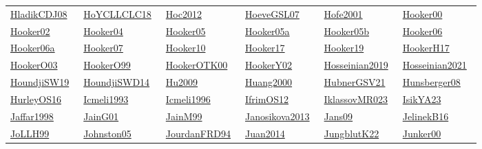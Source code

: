\begin{longtable}{*{6}{l}}
\href{../works/HladikCDJ08.pdf}{HladikCDJ08}~\cite{HladikCDJ08} & \href{../works/HoYCLLCLC18.pdf}{HoYCLLCLC18}~\cite{HoYCLLCLC18} & \href{../}{Hoc2012}~\cite{Hoc2012} & \href{../works/HoeveGSL07.pdf}{HoeveGSL07}~\cite{HoeveGSL07} & \href{../}{Hofe2001}~\cite{Hofe2001} & \href{../}{Hooker00}~\cite{Hooker00}\\ 
\href{../}{Hooker02}~\cite{Hooker02} & \href{../works/Hooker04.pdf}{Hooker04}~\cite{Hooker04} & \href{../works/Hooker05.pdf}{Hooker05}~\cite{Hooker05} & \href{../works/Hooker05a.pdf}{Hooker05a}~\cite{Hooker05a} & \href{../works/Hooker05b.pdf}{Hooker05b}~\cite{Hooker05b} & \href{../works/Hooker06.pdf}{Hooker06}~\cite{Hooker06}\\ 
\href{../}{Hooker06a}~\cite{Hooker06a} & \href{../works/Hooker07.pdf}{Hooker07}~\cite{Hooker07} & \href{../}{Hooker10}~\cite{Hooker10} & \href{../works/Hooker17.pdf}{Hooker17}~\cite{Hooker17} & \href{../works/Hooker19.pdf}{Hooker19}~\cite{Hooker19} & \href{../works/HookerH17.pdf}{HookerH17}~\cite{HookerH17}\\ 
\href{../works/HookerO03.pdf}{HookerO03}~\cite{HookerO03} & \href{../works/HookerO99.pdf}{HookerO99}~\cite{HookerO99} & \href{../works/HookerOTK00.pdf}{HookerOTK00}~\cite{HookerOTK00} & \href{../works/HookerY02.pdf}{HookerY02}~\cite{HookerY02} & \href{../}{Hosseinian2019}~\cite{Hosseinian2019} & \href{../}{Hosseinian2021}~\cite{Hosseinian2021}\\ 
\href{../works/HoundjiSW19.pdf}{HoundjiSW19}~\cite{HoundjiSW19} & \href{../works/HoundjiSWD14.pdf}{HoundjiSWD14}~\cite{HoundjiSWD14} & \href{../}{Hu2009}~\cite{Hu2009} & \href{../}{Huang2000}~\cite{Huang2000} & \href{../works/HubnerGSV21.pdf}{HubnerGSV21}~\cite{HubnerGSV21} & \href{../works/Hunsberger08.pdf}{Hunsberger08}~\cite{Hunsberger08}\\ 
\href{../works/HurleyOS16.pdf}{HurleyOS16}~\cite{HurleyOS16} & \href{../}{Icmeli1993}~\cite{Icmeli1993} & \href{../}{Icmeli1996}~\cite{Icmeli1996} & \href{../works/IfrimOS12.pdf}{IfrimOS12}~\cite{IfrimOS12} & \href{../works/IklassovMR023.pdf}{IklassovMR023}~\cite{IklassovMR023} & \href{../works/IsikYA23.pdf}{IsikYA23}~\cite{IsikYA23}\\ 
\href{../}{Jaffar1998}~\cite{Jaffar1998} & \href{../works/JainG01.pdf}{JainG01}~\cite{JainG01} & \href{../works/JainM99.pdf}{JainM99}~\cite{JainM99} & \href{../}{Janosikova2013}~\cite{Janosikova2013} & \href{../works/Jans09.pdf}{Jans09}~\cite{Jans09} & \href{../works/JelinekB16.pdf}{JelinekB16}~\cite{JelinekB16}\\ 
\href{../works/JoLLH99.pdf}{JoLLH99}~\cite{JoLLH99} & \href{../works/Johnston05.pdf}{Johnston05}~\cite{Johnston05} & \href{../}{JourdanFRD94}~\cite{JourdanFRD94} & \href{../}{Juan2014}~\cite{Juan2014} & \href{../works/JungblutK22.pdf}{JungblutK22}~\cite{JungblutK22} & \href{../works/Junker00.pdf}{Junker00}~\cite{Junker00}\\ 

\end{longtable}
